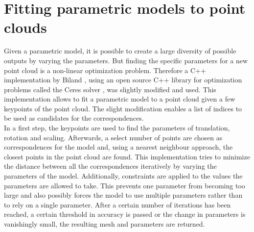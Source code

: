 \section{Fitting parametric models to point clouds}
\label{fitModel}
Given a parametric model, it is possible to create a large diversity of possible outputs by varying the parameters. But finding the specific parameters for a new point cloud is a non-linear optimization problem. Therefore a C++ implementation by Biland \cite{Biland17}, using an open source C++ library for optimization problems called the Ceres solver \cite{ceres-solver}, was slightly modified and used. This implementation allows to fit a parametric model to a point cloud given a few keypoints of the point cloud. The slight modification enables a list of indices to be used as candidates for the correspondences.\\
In a first step, the keypoints are used to find the parameters of translation, rotation and scaling. Afterwards, a select number of points are chosen as correspondences for the model and, using a nearest neighbour approach, the closest points in the point cloud are found. This implementation tries to minimize the distance between all the correspondences iteratively by varying the parameters of the model. Additionally, constraints are applied to the values the parameters are allowed to take. This prevents one parameter from becoming too large and also possibly forces the model to use multiple parameters rather than to rely on a single parameter. After a certain number of iterations has been reached, a certain threshold in accuracy is passed or the change in parameters is vanishingly small, the resulting mesh and parameters are returned.
